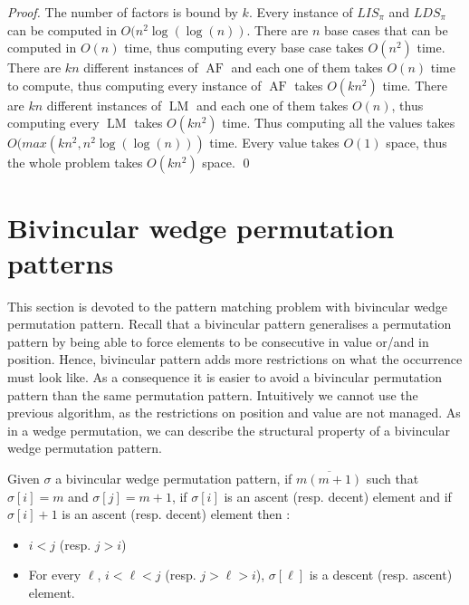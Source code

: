 \documentclass[a4paper]{llncs}
\newcommand{\ptext}{\pi}
\newcommand{\ppattern}{\sigma}
\newcounter{num}
\DeclareMathOperator{\LMa}{LM}
\DeclareMathOperator{\AFa}{AF}
\begin{document}
\begin{proof}
The number of factors is bound by $k$.
Every instance of $LIS_{\ptext}$ and $LDS_{\ptext}$ can be computed in $O(n^2\log(\log(n))$.
There are $n$ base cases that can be computed in $O(n)$ time, thus computing every base case
takes $O(n^2)$ time.
There are $kn$ different instances of $\AFa$ and each one of them takes $O(n)$ time to compute, 
thus computing every instance of $\AFa$ takes $O(kn^2)$ time.
There are $kn$ different instances of $\LMa$ and each one of them takes $O(n)$, 
thus computing every $\LMa$ takes $O(kn^2)$ time.
Thus computing all the values takes $O(max(kn^2,n^2\log(\log(n)))$ time.
Every value takes $O(1)$ space, thus the whole problem takes $O(kn^2)$ space.
\qed
\end{proof}


\section{Bivincular wedge permutation patterns}
	\label{section:bivincular}

This section is devoted to the pattern matching problem with bivincular wedge permutation pattern.
Recall that a bivincular pattern generalises a permutation pattern by
being able to force elements to be consecutive in value or/and in position.
Hence,  bivincular pattern adds more restrictions on what the occurrence must look like.
As a consequence it is easier to avoid a bivincular permutation pattern than
the same permutation pattern.
Intuitively we cannot use the previous algorithm, as the restrictions on position and value are not managed.
As in a wedge permutation, we can describe the structural property of a  bivincular wedge permutation pattern.

\begin{lemma}
\label{lemma:ascentDescentAscent}
Given $\ppattern$ a bivincular wedge permutation pattern,
if $\overline{m(m+1)}$ such that $\sigma[i]=m$ and $\sigma[j]=m+1$,
if $\sigma[i]$ is an ascent (resp. decent) element and if $\sigma[i]+1$ is an ascent 
(resp. decent) element then :  
\begin{itemize}
	\item $i<j$ (resp. $j>i$)
	\item For every $\ell$, $i<\ell<j$ (resp. $j>\ell>i$), $\sigma[\ell]$ is a descent (resp. ascent) element.    
\end{itemize}
\end{lemma}
\end{document}
